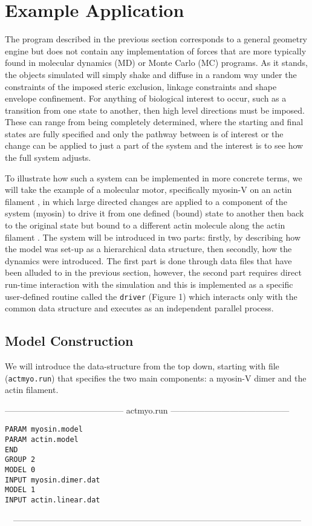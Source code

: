 \section{Example Application}

The program described in the previous section corresponds to a general
geometry engine but does not contain any implementation of forces that
are more typically found in molecular dynamics (MD) or Monte Carlo (MC)
programs.  As it stands, the objects simulated will simply shake and diffuse
in a random way under the constraints of the imposed steric exclusion,
linkage constraints and shape envelope confinement.  For anything of
biological interest to occur,  such as a transition from one state to
another, then high level directions must be imposed.   These can range
from being completely determined, where the starting and final states
are fully specified and only the pathway between is of interest or
the change can be applied to just a part of the system and the interest
is to see how the full system adjusts.

To illustrate how such a system can be implemented in more concrete
terms, we will take the example of a molecular motor, specifically
myosin-V on an actin filament \cite{MehtaADet99,DeLaCruzEMet99,ForkeyJNet03}, in which large directed changes are
applied to a component of the system (myosin)  to drive it from one
defined (bound) state to another then back to the original state but
bound to a different actin molecule along the actin filament \cite{KoderaNet10}.  The 
system will be introduced in two parts: firstly, by describing how the
model was set-up as a hierarchical data structure, then secondly, how
the dynamics were introduced.   The first part is done through data
files that have been alluded to in the previous section, however, the
second part requires direct run-time interaction with the simulation
and this is implemented as a specific user-defined routine called
the {\tt driver} (Figure 1) which interacts only with the common data
structure and executes as an independent parallel process.

\subsection{Model Construction}

We will introduce the data-structure from the top down, starting 
with file ({\tt actmyo.run}) that specifies the two main components:
a myosin-V dimer and the actin filament.
\begin{singlespace}
------------------------------------------
actmyo.run
------------------------------------------
\begin{verbatim}
PARAM myosin.model
PARAM actin.model
END
GROUP 2
MODEL 0
INPUT myosin.dimer.dat
MODEL 1
INPUT actin.linear.dat
\end{verbatim}
\ \ ------------------------------------------------------------------------------------------------------
\end{singlespace}

